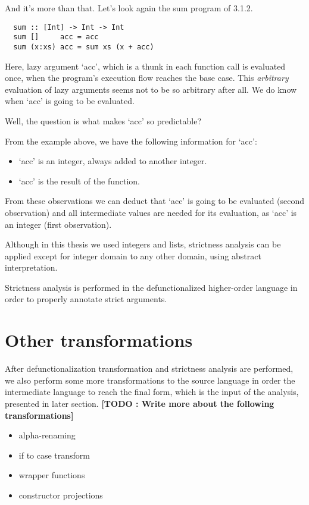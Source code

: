 \documentclass[diploma]{softlab-thesis}
\begin{document}
And it's more than that. Let's look again the sum program of 3.1.2.
\begin{verbatim}
  sum :: [Int] -> Int -> Int
  sum []     acc = acc
  sum (x:xs) acc = sum xs (x + acc)
\end{verbatim}

Here, lazy argument `acc', which is a thunk in each function call is evaluated once, when the program's 
execution flow reaches the base case. This \textit{arbitrary} evaluation of lazy arguments seems not to 
be so arbitrary after all. We do know when `acc' is going to be evaluated.
\newline
\par Well, the question is what makes `acc' so predictable? 

From the example above, we have the following information for `acc':
\begin{itemize}
  \item `acc' is an integer, always added to another integer.
  \item `acc' is the result of the function.
\end{itemize}

From these observations we can deduct that `acc' is going to be evaluated (second observation) and 
all intermediate values are needed for its evaluation, as `acc' is an integer (first observation).
\newline
\par Although in this thesis we used integers and lists, strictness analysis can be applied except for 
integer domain to any other domain, using abstract interpretation.
\newline
\par Strictness analysis is performed in the defunctionalized higher-order language in order to 
properly annotate strict arguments.

\section {Other transformations}

After defunctionalization transformation and strictness analysis are performed, we also 
perform some more transformations to the source language in order the intermediate 
language to reach the final form, which is the input of the analysis, presented in later section.
\textbf{[TODO : Write more about the following transformations]}
\begin{itemize}
  \item alpha-renaming
  \item if to case transform 
  \item wrapper functions 
  \item constructor projections
\end{itemize}
\end{document}
